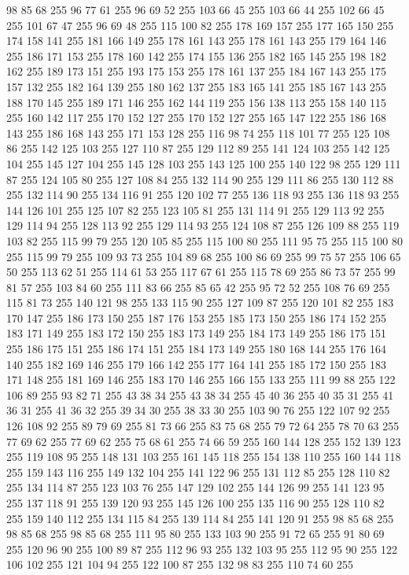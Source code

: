 98 85 68 255 96 77 61 255 96 69 52 255 103 66 45 255 103 66 44 255 102 66 45 255 101 67 47 255 96 69 48 255 115 100 82 255 178 169 157 255 177 165 150 255 174 158 141 255 181 166 149 255 178 161 143 255 178 161 143 255 179 164 146 255 186 171 153 255 178 160 142 255 174 155 136 255 182 165 145 255 198 182 162 255 189 173 151 255 193 175 153 255 178 161 137 255 184 167 143 255 175 157 132 255 182 164 139 255 180 162 137 255 183 165 141 255 185 167 143 255 188 170 145 255 189 171 146 255 162 144 119 255 156 138 113 255 158 140 115 255 160 142 117 255 170 152 127 255 170 152 127 255 165 147 122 255 186 168 143 255 186 168 143 255 171 153 128 255 116 98 74 255 118 101 77 255 125 108 86 255 142 125 103 255 127 110 87 255 129 112 89 255 141 124 103 255 142 125 104 255 145 127 104 255 145 128 103 255 143 125 100 255 140 122 98 255 129 111 87 255 124 105 80 255 127 108 84 255 132 114 90 255 129 111 86 255 130 112 88 255 132 114 90 255 134 116 91 255 120 102 77 255 136 118 93 255
136 118 93 255 144 126 101 255 125 107 82 255 123 105 81 255 131 114 91 255 129 113 92 255 129 114 94 255 128 113 92 255 129 114 93 255 124 108 87 255 126 109 88 255 119 103 82 255 115 99 79 255 120 105 85 255 115 100 80 255 111 95 75 255 115 100 80 255 115 99 79 255 109 93 73 255 104 89 68 255 100 86 69 255 99 75 57 255 106 65 50 255 113 62 51 255 114 61 53 255 117 67 61 255 115 78 69 255 86 73 57 255 99 81 57 255 103 84 60 255 111 83 66 255 85 65 42 255 95 72 52 255 108 76 69 255 115 81 73 255 140 121 98 255 133 115 90 255 127 109 87 255 120 101 82 255 183 170 147 255 186 173 150 255 187 176 153 255 185 173 150 255 186 174 152 255 183 171 149 255 183 172 150 255 183 173 149 255 184 173 149 255 186 175 151 255 186 175 151 255 186 174 151 255 184 173 149 255 180 168 144 255 176 164 140 255 182 169 146 255 179 166 142 255 177 164 141 255 185 172 150 255 183 171 148 255 181 169 146 255 183 170 146 255 166 155 133 255 111 99 88 255 122 106 89 255
93 82 71 255 43 38 34 255 43 38 34 255 45 40 36 255 40 35 31 255 41 36 31 255 41 36 32 255 39 34 30 255 38 33 30 255 103 90 76 255 122 107 92 255 126 108 92 255 89 79 69 255 81 73 66 255 83 75 68 255 79 72 64 255 78 70 63 255 77 69 62 255 77 69 62 255 75 68 61 255 74 66 59 255 160 144 128 255 152 139 123 255 119 108 95 255 148 131 103 255 161 145 118 255 154 138 110 255 160 144 118 255 159 143 116 255 149 132 104 255 141 122 96 255 131 112 85 255 128 110 82 255 134 114 87 255 123 103 76 255 147 129 102 255 144 126 99 255 141 123 95 255 137 118 91 255 139 120 93 255 145 126 100 255 135 116 90 255 128 110 82 255 159 140 112 255 134 115 84 255 139 114 84 255 141 120 91 255 98 85 68 255 98 85 68 255 98 85 68 255 111 95 80 255 133 103 90 255 91 72 65 255 91 80 69 255 120 96 90 255 100 89 87 255 112 96 93 255 132 103 95 255 112 95 90 255 122 106 102 255 121 104 94 255 122 100 87 255 132 98 83 255 110 74 60 255
